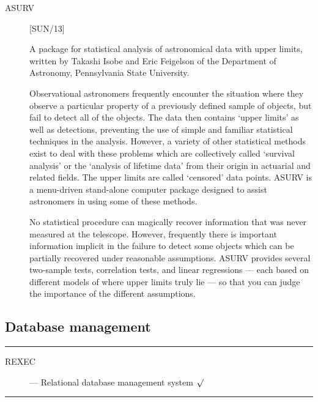 \begin{description}
\item [ASURV] \hfill [SUN/13]

A package for statistical analysis of astronomical data with upper
limits, written by Takashi Isobe and Eric Feigelson of the Department of
Astronomy, Pennsylvania State University.

Observational astronomers frequently encounter the situation where they
observe a particular property of a previously defined sample of objects,
but fail to detect all of the objects.
The data then contains `upper limits' as well as detections, preventing the
use of simple and familiar statistical techniques in the analysis.
However, a variety of other statistical methods exist to deal with these
problems which are collectively called `survival analysis' or the `analysis
of lifetime data' from their origin in actuarial and related fields.
The upper limits are called `censored' data points.
ASURV is a menu-driven stand-alone computer package designed to assist
astronomers in using some of these methods.

No statistical procedure can magically recover information that was never
measured at the telescope.
However, frequently there is important information implicit in the failure
to detect some objects which can be partially recovered under reasonable
assumptions.
ASURV provides several two-sample tests, correlation tests, and linear
regressions --- each based on different models of where upper limits truly lie
--- so that you can judge the importance of the different assumptions.

\end{description}

\newpage

\subsection{Database management}

\rule{\textwidth}{0.5mm}
\begin{description}
\begin{description}
\item [REXEC] --- Relational database management system \hfill $\surd$
\end{description}
\end{description}
\rule{\textwidth}{0.5mm}

